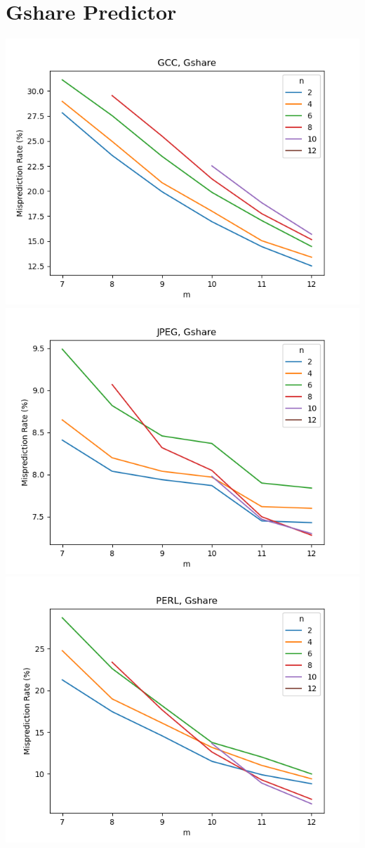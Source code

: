 \documentclass{article}
\begin{document}
\begin{center}
    \end{center}

    \section{Gshare Predictor}

    \begin{center}
        
        \includegraphics[scale=0.83]{../graph_logs/GCC_gshare.png}
        \includegraphics[scale=0.83]{../graph_logs/JPEG_gshare.png}
        \includegraphics[scale=0.83]{../graph_logs/PERL_gshare.png}
    \end{center}
\end{document}
